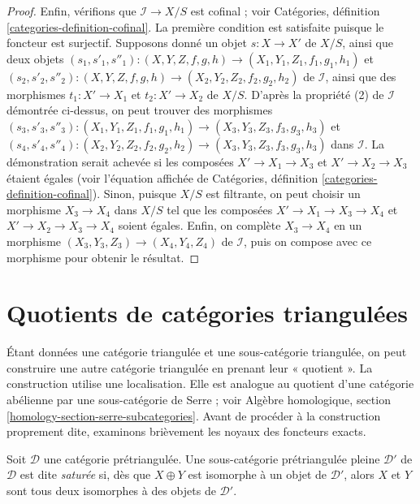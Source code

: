\begin{proof}
\medskip\noindent
Enfin, vérifions que $\mathcal{I} \to X/S$ est cofinal ; voir Catégories,
définition \ref{categories-definition-cofinal}. La première condition est
satisfaite puisque le foncteur est surjectif. Supposons donné un objet
$s : X \to X'$ de $X/S$, ainsi que deux objets
$(s_1, s'_1, s''_1) : (X, Y, Z, f, g, h) \to (X_1, Y_1, Z_1, f_1, g_1, h_1)$
et
$(s_2, s'_2, s''_2) : (X, Y, Z, f, g, h) \to (X_2, Y_2, Z_2, f_2, g_2, h_2)$
de $\mathcal{I}$, ainsi que des morphismes $t_1 : X' \to X_1$ et
$t_2 : X' \to X_2$ de $X/S$. D'après la propriété (2) de $\mathcal{I}$
démontrée ci-dessus, on peut trouver des morphismes
$(s_3, s'_3, s''_3) : (X_1, Y_1, Z_1, f_1, g_1, h_1) \to
(X_3, Y_3, Z_3, f_3, g_3, h_3)$
et
$(s_4, s'_4, s''_4) : (X_2, Y_2, Z_2, f_2, g_2, h_2) \to
(X_3, Y_3, Z_3, f_3, g_3, h_3)$ dans $\mathcal{I}$.
La démonstration serait achevée si les composées
$X' \to X_1 \to X_3$ et $X' \to X_2 \to X_3$ étaient égales (voir
l'équation affichée de Catégories, définition
\ref{categories-definition-cofinal}). Sinon, puisque $X/S$ est filtrante, on
peut choisir un morphisme $X_3 \to X_4$ dans $X/S$ tel que les composées
$X' \to X_1 \to X_3 \to X_4$ et $X' \to X_2 \to X_3 \to X_4$ soient égales.
Enfin, on complète $X_3 \to X_4$ en un morphisme
$(X_3, Y_3, Z_3) \to (X_4, Y_4, Z_4)$ de $\mathcal{I}$, puis on compose avec ce
morphisme pour obtenir le résultat.
\end{proof}

\section{Quotients de catégories triangulées}
\label{section-quotients}

\noindent
Étant données une catégorie triangulée et une sous-catégorie triangulée, on peut
construire une autre catégorie triangulée en prenant leur « quotient ».
La construction utilise une localisation. Elle est analogue au quotient d'une
catégorie abélienne par une sous-catégorie de Serre ; voir Algèbre homologique,
section \ref{homology-section-serre-subcategories}.
Avant de procéder à la construction proprement dite, examinons brièvement les
noyaux des foncteurs exacts.

\begin{definition}
\label{definition-saturated}
Soit $\mathcal{D}$ une catégorie prétriangulée. Une sous-catégorie
prétriangulée pleine $\mathcal{D}'$ de $\mathcal{D}$ est dite {\it saturée} si,
dès que $X \oplus Y$ est isomorphe à un objet de $\mathcal{D}'$, alors $X$ et
$Y$ sont tous deux isomorphes à des objets de $\mathcal{D}'$.
\end{definition}

